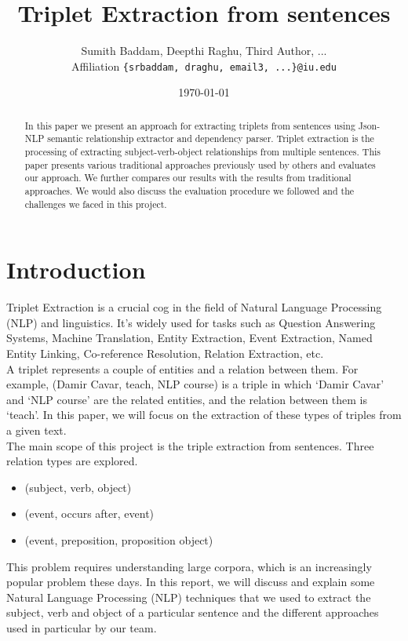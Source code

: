 \documentclass[11pt,letterpaper]{article}
\title{Triplet Extraction from sentences}
\author{Sumith Baddam, Deepthi Raghu, Third Author, ... \\
  Affiliation
  {\tt \{srbaddam, draghu, email3, ...\}@iu.edu} \\}
\date{\today}
\begin{document}
\maketitle

\begin{abstract}
  In this paper we present an approach for extracting triplets from sentences using Json-NLP semantic relationship extractor and dependency parser. Triplet extraction is the processing of extracting subject-verb-object relationships from multiple sentences. This paper presents various traditional approaches previously used by others and evaluates our approach. We further compares our results with the results from traditional approaches. We would also discuss the evaluation procedure we followed and the challenges we faced in this project.
\end{abstract}

\section{Introduction}

Triplet Extraction is a crucial cog in the field of Natural Language Processing (NLP) and linguistics. It’s widely used for tasks such as Question Answering Systems, Machine Translation, Entity Extraction, Event Extraction, Named Entity Linking, Co-reference Resolution, Relation Extraction, etc.\\

A triplet represents a couple of entities and a relation between them. For example, (Damir Cavar, teach, NLP course) is a triple in which ‘Damir Cavar’ and ‘NLP course’ are the related entities, and the relation between them is ‘teach’. In this paper, we will focus on the extraction of these types of triples from a given text.\\

The main scope of this project is the triple extraction from sentences. Three relation types are explored.

\begin{itemize}
    \item (subject, verb, object)
    \item (event, occurs after, event)
    \item (event, preposition, proposition object)
\end{itemize}

This problem requires understanding large corpora, which is an increasingly popular problem these days. In this report, we will discuss and explain some Natural Language Processing (NLP) techniques that we used to extract the subject, verb and object of a particular sentence and the different approaches used in particular by our team.
\end{document}
